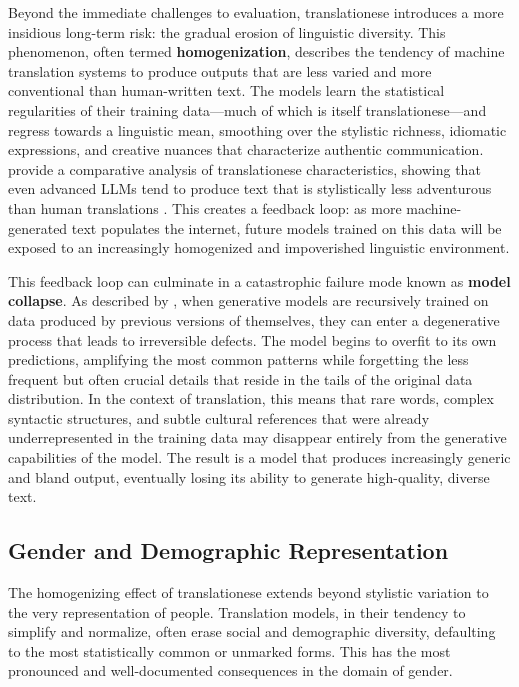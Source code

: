 \documentclass[11pt,a4paper]{article}
\begin{document}
Beyond the immediate challenges to evaluation, translationese introduces a more insidious long-term risk: the gradual erosion of linguistic diversity. This phenomenon, often termed \textbf{homogenization}, describes the tendency of machine translation systems to produce outputs that are less varied and more conventional than human-written text. The models learn the statistical regularities of their training data---much of which is itself translationese---and regress towards a linguistic mean, smoothing over the stylistic richness, idiomatic expressions, and creative nuances that characterize authentic communication. \citet{sizov2024analysing} provide a comparative analysis of translationese characteristics, showing that even advanced LLMs tend to produce text that is stylistically less adventurous than human translations \cite{vanmassenhove2021machine}. This creates a feedback loop: as more machine-generated text populates the internet, future models trained on this data will be exposed to an increasingly homogenized and impoverished linguistic environment.

This feedback loop can culminate in a catastrophic failure mode known as \textbf{model collapse}. As described by \citet{shumailov2024ai}, when generative models are recursively trained on data produced by previous versions of themselves, they can enter a degenerative process that leads to irreversible defects. The model begins to overfit to its own predictions, amplifying the most common patterns while forgetting the less frequent but often crucial details that reside in the tails of the original data distribution. In the context of translation, this means that rare words, complex syntactic structures, and subtle cultural references that were already underrepresented in the training data may disappear entirely from the generative capabilities of the model. The result is a model that produces increasingly generic and bland output, eventually losing its ability to generate high-quality, diverse text.

\subsection{Gender and Demographic Representation}

The homogenizing effect of translationese extends beyond stylistic variation to the very representation of people. Translation models, in their tendency to simplify and normalize, often erase social and demographic diversity, defaulting to the most statistically common or unmarked forms. This has the most pronounced and well-documented consequences in the domain of gender.
\end{document}
